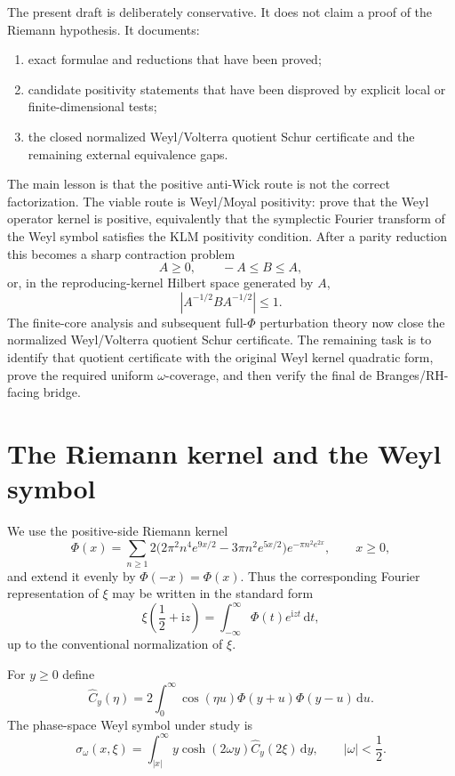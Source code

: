 \documentclass[11pt]{article}
\newcommand{\ii}{\mathrm i}
\newcommand{\dd}{\,\mathrm d}
\begin{document}
The present draft is deliberately conservative.  It does not claim a proof of
the Riemann hypothesis.  It documents:
\begin{enumerate}
  \item exact formulae and reductions that have been proved;
  \item candidate positivity statements that have been disproved by explicit
        local or finite-dimensional tests;
  \item the closed normalized Weyl/Volterra quotient Schur certificate and the
        remaining external equivalence gaps.
\end{enumerate}

The main lesson is that the positive anti-Wick route is not the correct
factorization.  The viable route is Weyl/Moyal positivity: prove that the Weyl
operator kernel is positive, equivalently that the symplectic Fourier transform
of the Weyl symbol satisfies the KLM positivity condition.  After a parity
reduction this becomes a sharp contraction problem
\[
       A\ge 0,\qquad -A\le B\le A,
\]
or, in the reproducing-kernel Hilbert space generated by $A$,
\[
       |A^{-1/2}BA^{-1/2}|\le 1.
\]
The finite-core analysis and subsequent full-\(\Phi\) perturbation theory now
close the normalized Weyl/Volterra quotient Schur certificate.  The remaining
task is to identify that quotient certificate with the original Weyl kernel
quadratic form, prove the required uniform \(\omega\)-coverage, and then verify
the final de Branges/RH-facing bridge.

\section{The Riemann kernel and the Weyl symbol}

We use the positive-side Riemann kernel
\begin{equation}
  \Phi(x)=\sum_{n\ge 1}
  2\bigl(2\pi^2 n^4e^{9x/2}-3\pi n^2e^{5x/2}\bigr)
  e^{-\pi n^2e^{2x}},
  \qquad x\ge 0,
  \label{eq:Phi}
\end{equation}
and extend it evenly by $\Phi(-x)=\Phi(x)$.  Thus the corresponding Fourier
representation of $\xi$ may be written in the standard form
\[
  \xi\!\left(\frac12+\ii z\right)
   = \int_{-\infty}^{\infty}\Phi(t)e^{\ii zt}\dd t,
\]
up to the conventional normalization of $\xi$.

For $y\ge 0$ define
\begin{equation}
  \widehat C_y(\eta)
   =2\int_0^\infty \cos(\eta u)\Phi(y+u)\Phi(y-u)\dd u.
  \label{eq:Chat}
\end{equation}
The phase-space Weyl symbol under study is
\begin{equation}
  \sigma_\omega(x,\xi)
   =\int_{|x|}^{\infty}
      y\cosh(2\omega y)\widehat C_y(2\xi)\dd y,
  \qquad |\omega|<\frac12.
  \label{eq:sigma}
\end{equation}
\end{document}
